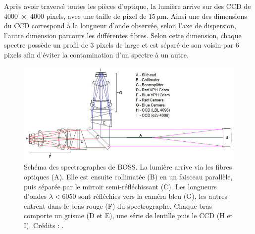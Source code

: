 Après avoir traversé toutes les pièces d'optique, la lumière arrive sur des CCD de \num{4000x4000} pixels, avec une taille de pixel de $\SI{15}{\micro\meter}$. Ainsi une des dimensions du CCD correspond à la longueur d'onde observée, selon l'axe de dispersion, l'autre dimension parcours les différentes fibres. Selon cette dimension, chaque spectre possède un profil de 3 pixels de large et  est séparé de son voisin par 6 pixels afin d'éviter la contamination d'un spectre à un autre.
\begin{figure}
  \centering
  \includegraphics[scale=0.5]{SchemaSpectro}
  \caption{Schéma des spectrographes de BOSS. La lumière arrive via les fibres optiques (A). Elle est ensuite collimatée (B) en un faisceau parallèle, puis séparée par le mirroir semi-réfléchissant (C). Les longueurs d'ondes $\lambda < \num{6050}$ sont réfléchies vers la caméra bleu (G), les autres entrent dans le bras rouge (F) du spectrographe. Chaque bras comporte un grisme (D et E), une série de lentille puis le CCD (H et I). Crédits : \textcite{Smee2012}.}
  \label{fig:SchemaSpectro}
\end{figure}

